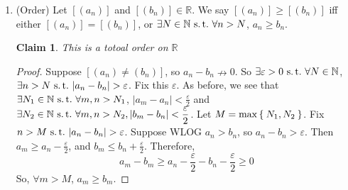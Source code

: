 \documentclass[12pt]{amsart}
\newcommand{\bbR}{\mathbb{R}}
\newcommand{\bbN}{\mathbb{N}}
\newcommand{\suchthat}{\operatorname{\thinspace s.t. \thinspace}}
\theoremstyle{plain}
\newtheorem*{claim}{Claim}
\theoremstyle{remark}
\theoremstyle{definition}
\begin{document}
\begin{enumerate}[(1)]
\begin{proof}
				Notice that $b_n$ is Cauchy because the sequence $\displaystyle \frac{1}{a_n}$ is Cauchy. Moreover, we can compute $(a_n b_n)$
				\begin{itemize}[-]
					\item
						If $n \leq N$, $ a_n b_n = a_n$
					\item
						If $n > N$, $a_n b_n = 1$
				\end{itemize}
				So $\forall n > N, a_n b_n = 1$. This means that $[(a_n b_n)] = 1$. Therefore every nonzero element of $\bbR$ has an inverse. 
		\end{proof}
		\item (Order)
		Let $[(a_n)]$ and $[(b_n)] \in \bbR$. We say $[(a_n)] \geqslant [(b_n)]$ iff either $[(a_n)] = [(b_n)]$, or $\exists N \in \bbN \suchthat \forall n > N$, $a_n \geqslant b_n$.
		\begin{claim}
			This is a totoal order on $\bbR$
		\end{claim}
		\begin{proof}
			Suppose $[(a_n) \neq (b_n)]$, so $a_n - b_n \nrightarrow 0$. So $\exists \varepsilon > 0 \suchthat \forall N\in \bbN$, $\exists n > N \suchthat |a_n - b_n| > \varepsilon$.
			\newline
			Fix this $\varepsilon$. As before, we see that $\exists N_1 \in \bbN \suchthat \forall m,n > N_1$, $|a_m - a_n| < \displaystyle \frac{\varepsilon}{2}$ and $\exists N_2\in \bbN \suchthat \forall m,n > N_2, |b_m - b_n| < \displaystyle \frac{\varepsilon}{2}$.
			\newline
			Let $M = \max\Set{N_1,N_2}$. Fix $n > M \suchthat |a_n - b_n| > \varepsilon$. Suppose WLOG $a_n > b_n$, so $a_n - b_n > \varepsilon$. Then $a_m \geqslant a_n - \displaystyle \frac{\varepsilon}{2}$, and $b_m \leqslant b_n + \displaystyle \frac{\varepsilon}{2}$. 
			\newline
			Therefore,
		\begin{equation*}
			a_m - b_m \geqslant a_n - \frac{\varepsilon}{2} - b_n - \frac{\varepsilon}{2} \geqslant 0
		\end{equation*}
		So, $\forall m > M$, $a_m \geqslant b_m$.
		\end{proof}


\end{enumerate}
\end{document}
